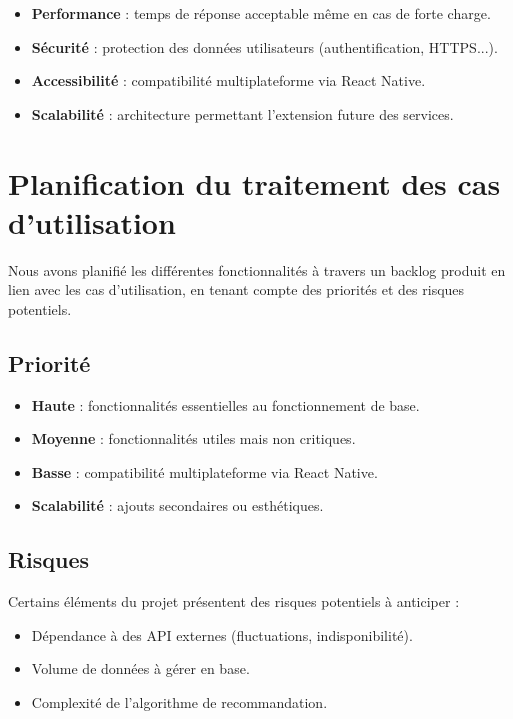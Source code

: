 \begin{itemize}
    \item \textbf{Performance} : temps de réponse acceptable même en cas de forte charge.
    \item \textbf{Sécurité} : protection des données utilisateurs (authentification, HTTPS...).
    \item \textbf{Accessibilité} : compatibilité multiplateforme via React Native.
    \item \textbf{Scalabilité} : architecture permettant l’extension future des services.
\end{itemize}

\section{Planification du traitement des cas d'utilisation}

Nous avons planifié les différentes fonctionnalités à travers un backlog produit en lien avec les cas d’utilisation, en tenant compte des priorités et des risques potentiels.

\subsection{Priorité}

\begin{itemize}
    \item \textbf{Haute} : fonctionnalités essentielles au fonctionnement de base.
    \item \textbf{Moyenne} : fonctionnalités utiles mais non critiques.
    \item \textbf{Basse} : compatibilité multiplateforme via React Native.
    \item \textbf{Scalabilité} : ajouts secondaires ou esthétiques.
\end{itemize}

\subsection{Risques}

Certains éléments du projet présentent des risques potentiels à anticiper :

\begin{itemize}
    \item Dépendance à des API externes (fluctuations, indisponibilité).
    \item Volume de données à gérer en base.
    \item Complexité de l’algorithme de recommandation.
\end{itemize}

